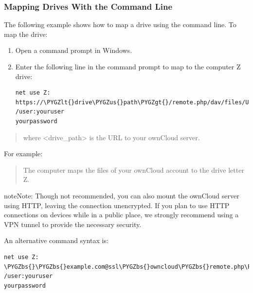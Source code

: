 \documentclass[letterpaper,10pt,english]{sphinxmanual}
\def\PYGZbs{\char`\\}
\def\PYGZus{\char`\_}
\def\PYGZlt{\char`\<}
\def\PYGZgt{\char`\>}
\begin{document}
\subsubsection{Mapping Drives With the Command Line}
\label{files/access_webdav:kb841215}\label{files/access_webdav:mapping-drives-with-the-command-line}
The following example shows how to map a drive using the command line.  To map
the drive:
\begin{enumerate}
\item {} 
Open a command prompt in Windows.

\item {} 
Enter the following line in the command prompt to map to the computer Z
drive:

\begin{Verbatim}[commandchars=\\\{\}]
net use Z: https://\PYGZlt{}drive\PYGZus{}path\PYGZgt{}/remote.php/dav/files/USERNAME/ /user:youruser
yourpassword
\end{Verbatim}

\end{enumerate}
\begin{quote}

where \textless{}drive\_path\textgreater{} is the URL to your ownCloud server.
\end{quote}

For example: 
\begin{quote}

The computer maps the files of your ownCloud account to the drive letter Z.
\end{quote}

\begin{notice}{note}{Note:}
Though not recommended, you can also mount the ownCloud server
using HTTP, leaving the connection unencrypted.  If you plan to use HTTP
connections on devices while in a public place, we strongly recommend using a
VPN tunnel to provide the necessary security.
\end{notice}

An alternative command syntax is:

\begin{Verbatim}[commandchars=\\\{\}]
net use Z: \PYGZbs{}\PYGZbs{}example.com@ssl\PYGZbs{}owncloud\PYGZbs{}remote.php\PYGZbs{}dav /user:youruser
yourpassword
\end{Verbatim}
\end{document}
